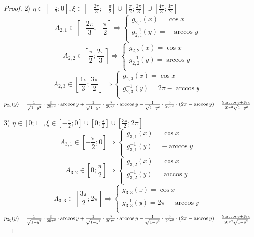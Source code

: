 \begin{proof}
2) $\eta \in [-\frac{1}{2};0], \xi \in [-\frac{2\pi}{3};-\frac{\pi}{2}]\cup       [\frac{\pi}{2};\frac{2\pi}{3}] \cup [\frac{4\pi}{3};\frac{3\pi}{2}]$\\
\[
A_{2,1} \in [-\frac{2\pi}{3};-\frac{\pi}{2}] \Rightarrow \begin{cases}
    g_{2,1}(x) = \cos{x}\\
    g_{2,1}^{-1}(y) = -\arccos{y}\\
\end{cases}
\]
\[
A_{2,2} \in [\frac{\pi}{2};\frac{2\pi}{3}] \Rightarrow \begin{cases}
    g_{2,2}(x) = \cos{x}\\
    g_{2,2}^{-1}(y) = \arccos{y}\\
\end{cases}
\]
\[
A_{2,3} \in [\frac{4\pi}{3};\frac{3\pi}{2}] \Rightarrow \begin{cases}
    g_{2,3}(x) = \cos{x}\\
    g_{2,3}^{-1}(y) = 2\pi -\arccos{y}\\
\end{cases}
\]
$p_{2\eta}(y) = \frac{1}{\sqrt{1 - y^2}}\cdot\frac{9}{20\pi^2}\cdot\arccos{y} + \frac{1}{\sqrt{1 - y^2}}\cdot\frac{9}{20\pi^2}\cdot\arccos{y} + \frac{1}{\sqrt{1 - y^2}}\cdot\frac{9}{20\pi^2}\cdot(2\pi - \arccos{y}) = \frac{9\arccos{y} + 18\pi}{20\pi^2 \sqrt{1-y^2}}\\$

3) $\eta \in [0;1], \xi \in [-\frac{\pi}{2};0] \cup [0;\frac{\pi}{2}] \cup [\frac{3\pi}{2};2\pi]$\\
\[
A_{3,1} \in [-\frac{\pi}{2};0] \Rightarrow \begin{cases}
    g_{3,1}(x) = \cos{x}\\
    g_{3,1}^{-1}(y) = -\arccos{y}\\
\end{cases}
\]
\[
A_{3,2} \in [0;\frac{\pi}{2}] \Rightarrow \begin{cases}
    g_{3,2}(x) = \cos{x}\\
    g_{3,2}^{-1}(y) = \arccos{y}\\
\end{cases}
\]
\[
A_{3,3} \in [\frac{3\pi}{2};2\pi] \Rightarrow \begin{cases}
    g_{3,3}(x) = \cos{x}\\
    g_{3,3}^{-1}(y) = 2\pi -\arccos{y}\\
\end{cases}
\]
$p_{3\eta}(y) = \frac{1}{\sqrt{1 - y^2}}\cdot\frac{9}{20\pi^2}\cdot\arccos{y} + \frac{1}{\sqrt{1 - y^2}}\cdot\frac{9}{20\pi^2}\cdot\arccos{y} + \frac{1}{\sqrt{1 - y^2}}\cdot\frac{9}{20\pi^2}\cdot(2\pi - \arccos{y}) = \frac{9\arccos{y} + 18\pi}{20\pi^2 \sqrt{1-y^2}}\\$


\end{proof}
